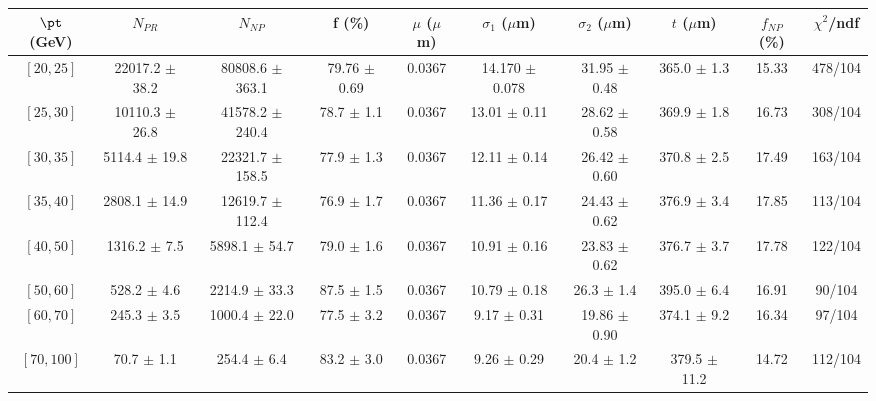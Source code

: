 \begin{tabular}{c||c|c|c|c|c|c|c||c|c}
$\pt$ (GeV) & $N_{PR}$ & $N_{NP}$ & f (\%) & $\mu$ ($\mu$m) & $\sigma_1$ ($\mu$m) & $\sigma_2$ ($\mu$m)  & $t$ ($\mu$m) & $f_{NP}$ (\%) & $\chi^2$/ndf \\
\hline
$[20, 25]$ & 22017.2 $\pm$ 38.2 & 80808.6 $\pm$ 363.1 & 79.76 $\pm$ 0.69 & 0.0367 & 14.170 $\pm$ 0.078 & 31.95 $\pm$ 0.48 & 365.0 $\pm$ 1.3 & 15.33 & 478/104\\
$[25, 30]$ & 10110.3 $\pm$ 26.8 & 41578.2 $\pm$ 240.4 & 78.7 $\pm$ 1.1 & 0.0367 & 13.01 $\pm$ 0.11 & 28.62 $\pm$ 0.58 & 369.9 $\pm$ 1.8 & 16.73 & 308/104\\
$[30, 35]$ & 5114.4 $\pm$ 19.8 & 22321.7 $\pm$ 158.5 & 77.9 $\pm$ 1.3 & 0.0367 & 12.11 $\pm$ 0.14 & 26.42 $\pm$ 0.60 & 370.8 $\pm$ 2.5 & 17.49 & 163/104\\
$[35, 40]$ & 2808.1 $\pm$ 14.9 & 12619.7 $\pm$ 112.4 & 76.9 $\pm$ 1.7 & 0.0367 & 11.36 $\pm$ 0.17 & 24.43 $\pm$ 0.62 & 376.9 $\pm$ 3.4 & 17.85 & 113/104\\
$[40, 50]$ & 1316.2 $\pm$ 7.5 & 5898.1 $\pm$ 54.7 & 79.0 $\pm$ 1.6 & 0.0367 & 10.91 $\pm$ 0.16 & 23.83 $\pm$ 0.62 & 376.7 $\pm$ 3.7 & 17.78 & 122/104\\
$[50, 60]$ & 528.2 $\pm$ 4.6 & 2214.9 $\pm$ 33.3 & 87.5 $\pm$ 1.5 & 0.0367 & 10.79 $\pm$ 0.18 & 26.3 $\pm$ 1.4 & 395.0 $\pm$ 6.4 & 16.91 & 90/104\\
$[60, 70]$ & 245.3 $\pm$ 3.5 & 1000.4 $\pm$ 22.0 & 77.5 $\pm$ 3.2 & 0.0367 & 9.17 $\pm$ 0.31 & 19.86 $\pm$ 0.90 & 374.1 $\pm$ 9.2 & 16.34 & 97/104\\
$[70, 100]$ & 70.7 $\pm$ 1.1 & 254.4 $\pm$ 6.4 & 83.2 $\pm$ 3.0 & 0.0367 & 9.26 $\pm$ 0.29 & 20.4 $\pm$ 1.2 & 379.5 $\pm$ 11.2 & 14.72 & 112/104\\
\end{tabular}
